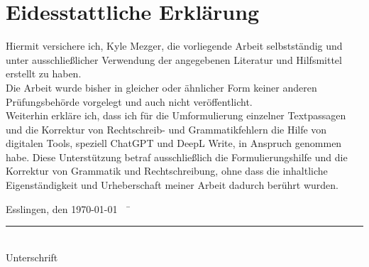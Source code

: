 \chapter*{Eidesstattliche Erklärung}

Hiermit versichere ich, Kyle Mezger, die vorliegende Arbeit selbstständig und unter ausschließlicher Verwendung der angegebenen Literatur und Hilfsmittel erstellt zu haben.\\
Die Arbeit wurde bisher in gleicher oder ähnlicher Form keiner anderen Prüfungsbehörde vorgelegt und auch nicht veröffentlicht.\\
Weiterhin erkläre ich, dass ich für die Umformulierung einzelner Textpassagen und die Korrektur von Rechtschreib- und Grammatikfehlern die Hilfe von digitalen Tools, speziell ChatGPT und DeepL Write, in Anspruch genommen habe.
Diese Unterstützung betraf ausschließlich die Formulierungshilfe und die Korrektur von Grammatik und Rechtschreibung, ohne dass  die inhaltliche Eigenständigkeit und Urheberschaft meiner Arbeit dadurch berührt wurden.\\
\begin{tabbing}
          Esslingen, den \today ~~	\= \rule{5cm}{0.3mm}\\
                                                                                                    \> Unterschrift
\end{tabbing}